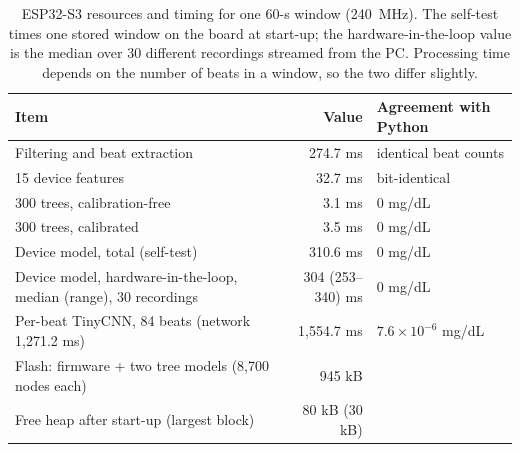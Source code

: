 \documentclass[10pt]{article}
\newcommand{\mgdl}{mg/dL}
\begin{document}
\begin{table}[H]
\centering\small
\begin{threeparttable}
\caption{ESP32-S3 resources and timing for one 60-s window (240~MHz). The self-test times one stored window on the board at start-up; the hardware-in-the-loop value is the median over 30 different recordings streamed from the PC. Processing time depends on the number of beats in a window, so the two differ slightly.}
\label{tab:esp}
\begin{tabular}{@{}lrl@{}}
\toprule
Item & Value & Agreement with Python \\
\midrule
Filtering and beat extraction & 274.7 ms & identical beat counts \\
15 device features & 32.7 ms & bit-identical \\
300 trees, calibration-free & 3.1 ms & 0 \mgdl{} \\
300 trees, calibrated & 3.5 ms & 0 \mgdl{} \\
\rowcolor{rowgray} Device model, total (self-test) & 310.6 ms & 0 \mgdl{} \\
Device model, hardware-in-the-loop, median (range), 30 recordings & 304 (253--340) ms & 0 \mgdl{} \\
Per-beat TinyCNN, 84 beats (network 1,271.2 ms) & 1,554.7 ms & $7.6\times10^{-6}$ \mgdl{} \\
\midrule
Flash: firmware + two tree models (8,700 nodes each) & 945 kB & \\
Free heap after start-up (largest block) & 80 kB (30 kB) & \\
\bottomrule
\end{tabular}
\end{threeparttable}
\end{table}
\end{document}
